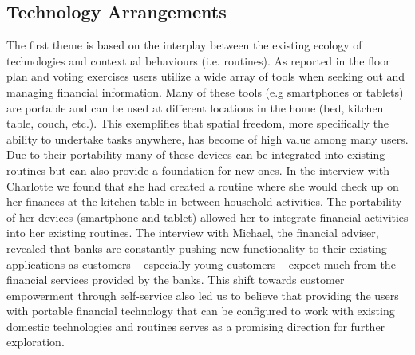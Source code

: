 \subsection{Technology Arrangements}
The first theme is based on the interplay between the existing ecology of technologies and contextual behaviours (i.e. routines). As reported in the floor plan and voting exercises users utilize a wide array of tools when seeking out and managing financial information. Many of these tools (e.g smartphones or tablets) are portable and can be used at different locations in the home (bed, kitchen table, couch, etc.). This exemplifies that spatial freedom, more specifically the ability to undertake tasks anywhere, has become of high value among many users. Due to their portability many of these devices can be integrated into existing routines but can also provide a foundation for new ones. In the interview with Charlotte we found that she had created a routine where she would check up on her finances at the kitchen table in between household activities. The portability of her devices (smartphone and tablet) allowed her to integrate financial activities into her existing routines. The interview with Michael, the financial adviser, revealed that banks are constantly pushing new functionality to their existing applications as customers -- especially young customers -- expect much from the financial services provided by the banks. This shift towards customer empowerment through self-service also led us to believe that providing the users with portable financial technology that can be configured to work with existing domestic technologies and routines serves as a promising direction for further exploration.

